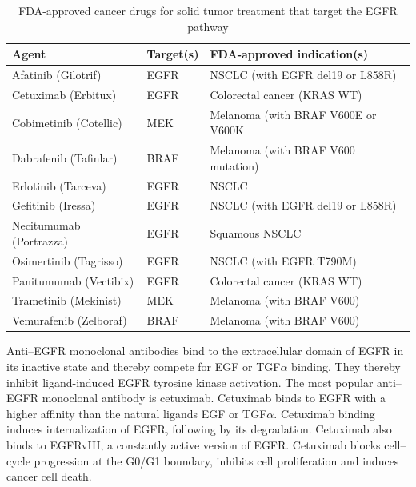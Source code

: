 {{      \begin{table}[!htbp]
          \caption[Targeted Cancer Agents]{FDA-approved cancer drugs for solid tumor treatment that target the EGFR pathway}
          \centering
          \begin{tabular}{ |p{4cm}|p{3.7cm}|p{6.3cm}|}
          \hline
          Agent & Target(s) & FDA-approved indication(s) \\ \hline \hline
          Afatinib (Gilotrif) & EGFR & NSCLC (with EGFR del19 or L858R) \\
          Cetuximab (Erbitux) & EGFR & Colorectal cancer (KRAS WT) \\
          Cobimetinib (Cotellic) & MEK & Melanoma (with BRAF V600E or V600K \\
          Dabrafenib (Tafinlar) & BRAF & Melanoma (with BRAF V600 mutation) \\
          Erlotinib (Tarceva) & EGFR & NSCLC \\
          Gefitinib (Iressa) & EGFR & NSCLC (with EGFR del19 or L858R) \\
          Necitumumab (Portrazza) & EGFR & Squamous NSCLC \\
          Osimertinib (Tagrisso) & EGFR & NSCLC (with EGFR T790M) \\
          Panitumumab (Vectibix) & EGFR & Colorectal cancer (KRAS WT) \\
          Trametinib (Mekinist) & MEK & Melanoma (with BRAF V600) \\
          Vemurafenib (Zelboraf) & BRAF & Melanoma (with BRAF V600) \\
          \hline
        \end{tabular}
      \end{table}

      Anti--EGFR monoclonal antibodies bind to the extracellular domain of EGFR
      in its inactive state and thereby compete for EGF or TGF$\alpha$ binding.
      They thereby inhibit ligand-induced EGFR tyrosine kinase activation. The
      most popular anti--EGFR monoclonal antibody is cetuximab. Cetuximab binds
      to EGFR with a higher affinity than the natural ligands EGF or
      TGF$\alpha$. Cetuximab binding induces internalization of EGFR, following
      by its degradation. Cetuximab also binds to EGFRvIII, a constantly active
      version of EGFR. Cetuximab blocks cell--cycle  progression at the G0/G1
      boundary, inhibits cell proliferation and induces cancer cell death.

}}
